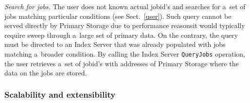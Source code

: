 \emph{Search for jobs.}
The user does not known actual jobid's and searches for a~set of
jobs matching particular conditions (see Sect.~\ref{user}).
Such query cannot be served directly by \JP Primary Storage due to performance
reasons\Dash it would typically require sweep through a~large set of primary data.
On the contrary, the query must be directed to an Index Server that was
already populated with jobs matching a~broader condition. 
By calling
the Index Server \texttt{QueryJobs} operation, the user
retrieves
a~set of jobid's with addresses of Primary Storage
where the data on the jobs are stored.

 
\subsubsection{Scalability and extensibility}
\fi

